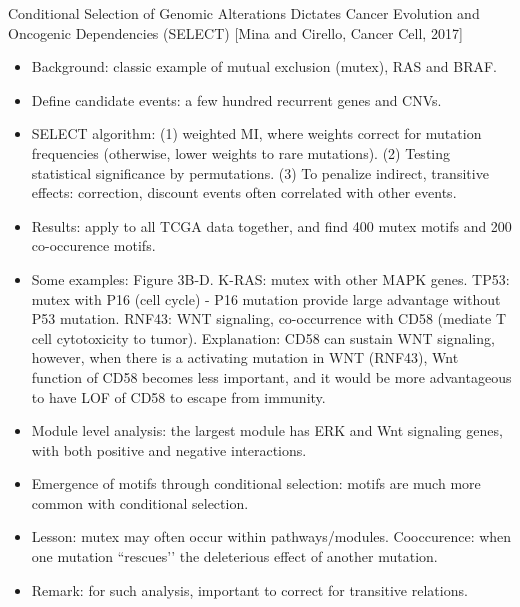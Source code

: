 \documentclass{report}
\begin{document}
Conditional Selection of Genomic Alterations Dictates Cancer Evolution and Oncogenic Dependencies (SELECT) [Mina and Cirello, Cancer Cell, 2017]
\begin{itemize}
	\item Background: classic example of mutual exclusion (mutex), RAS and BRAF.
	
	\item Define candidate events: a few hundred recurrent genes and CNVs.
	
	\item SELECT algorithm: (1) weighted MI, where weights correct for mutation frequencies (otherwise, lower weights to rare mutations). (2) Testing statistical significance by permutations. (3) To penalize indirect, transitive effects: correction, discount events often correlated with other events.
	
	\item Results: apply to all TCGA data together, and find 400 mutex motifs and 200 co-occurence motifs.
	
	\item Some examples: Figure 3B-D. K-RAS: mutex with other MAPK genes. TP53: mutex with P16 (cell cycle) - P16 mutation provide large advantage without P53 mutation. RNF43: WNT signaling, co-occurrence with CD58 (mediate T cell cytotoxicity to tumor). Explanation: CD58 can sustain WNT signaling, however, when there is a activating mutation in WNT (RNF43), Wnt function of CD58 becomes less important, and it would be more advantageous to have LOF of CD58 to escape from immunity.
	
	\item Module level analysis: the largest module has ERK and Wnt signaling genes, with both positive and negative interactions.
	
	\item Emergence of motifs through conditional selection: motifs are much more common with conditional selection.
	
	\item Lesson: mutex may often occur within pathways/modules. Cooccurence: when one mutation ``rescues’’ the deleterious effect of another mutation.
	
	\item Remark: for such analysis, important to correct for transitive relations.
\end{itemize}
\end{document}
